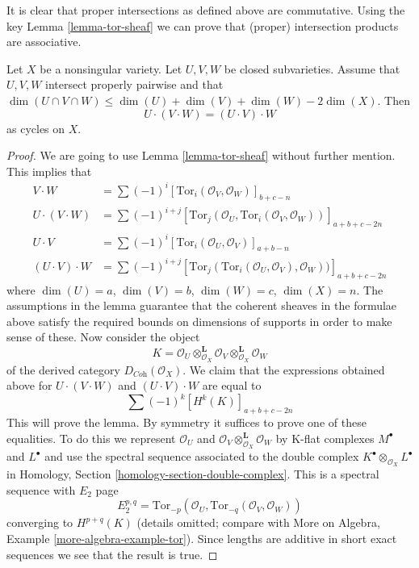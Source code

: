 \noindent
It is clear that proper intersections as defined above are commutative.
Using the key Lemma \ref{lemma-tor-sheaf} we can prove that (proper)
intersection products are associative.

\begin{lemma}
\label{lemma-associative}
Let $X$ be a nonsingular variety. Let $U, V, W$ be closed
subvarieties. Assume that $U, V, W$ intersect properly pairwise
and that $\dim(U \cap V \cap W) \leq \dim(U) + \dim(V) + \dim(W) - 2\dim(X)$.
Then
$$
U \cdot (V \cdot W) = (U \cdot V) \cdot W
$$
as cycles on $X$.
\end{lemma}

\begin{proof}
We are going to use Lemma \ref{lemma-tor-sheaf} without further mention.
This implies that
\begin{align*}
V \cdot W
& =
\sum (-1)^i [\text{Tor}_i(\mathcal{O}_V, \mathcal{O}_W)]_{b + c - n} \\
U \cdot (V \cdot W)
& =
\sum (-1)^{i + j}
[
\text{Tor}_j(\mathcal{O}_U, \text{Tor}_i(\mathcal{O}_V, \mathcal{O}_W))
]_{a + b + c - 2n} \\
U \cdot V
& =
\sum (-1)^i [\text{Tor}_i(\mathcal{O}_U, \mathcal{O}_V)]_{a + b - n} \\
(U \cdot V) \cdot W
& =
\sum (-1)^{i + j}
[
\text{Tor}_j(\text{Tor}_i(\mathcal{O}_U, \mathcal{O}_V), \mathcal{O}_W))
]_{a + b + c - 2n}
\end{align*}
where $\dim(U) = a$, $\dim(V) = b$, $\dim(W) = c$, $\dim(X) = n$.
The assumptions in the lemma guarantee that the coherent sheaves
in the formulae above satisfy the required bounds on dimensions
of supports in order to make sense of these. Now consider the object
$$
K =
\mathcal{O}_U \otimes^\mathbf{L}_{\mathcal{O}_X} \mathcal{O}_V
\otimes^\mathbf{L}_{\mathcal{O}_X} \mathcal{O}_W
$$
of the derived category $D_{\textit{Coh}}(\mathcal{O}_X)$.
We claim that the expressions obtained above for
$U \cdot (V \cdot W)$ and $(U \cdot V) \cdot W$
are equal to
$$
\sum (-1)^k [H^k(K)]_{a + b + c - 2n}
$$
This will prove the lemma. By symmetry it suffices to prove one
of these equalities. To do this we represent $\mathcal{O}_U$
and $\mathcal{O}_V \otimes_{\mathcal{O}_X}^\mathbf{L} \mathcal{O}_W$
by K-flat complexes $M^\bullet$ and $L^\bullet$ and use the
spectral sequence associated to the double complex
$K^\bullet \otimes_{\mathcal{O}_X} L^\bullet$ in
Homology, Section \ref{homology-section-double-complex}.
This is a spectral sequence with $E_2$ page
$$
E_2^{p, q} =
\text{Tor}_{-p}(\mathcal{O}_U, \text{Tor}_{-q}(\mathcal{O}_V, \mathcal{O}_W))
$$
converging to $H^{p + q}(K)$ (details omitted; compare with
More on Algebra, Example \ref{more-algebra-example-tor}).
Since lengths are additive in short
exact sequences we see that the result is true.
\end{proof}




